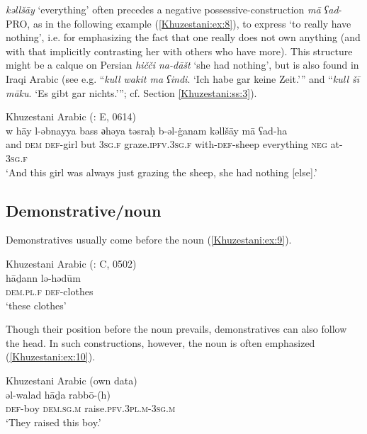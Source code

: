 \documentclass[output=paper,colorlinks,citecolor=brown,draftmode]{langscibook}
\begin{document}
\textit{kəllšāy} `everything' often precedes a negative possessive-construction \textit{mā ʕad}-PRO, as in the following example (\ref{Khuzestani:ex:8}), to express `to really have nothing', i.e. for emphasizing the fact that one really does not own anything (and with that implicitly contrasting her with others who have more). This structure might be a calque on Persian \textit{hičči na-dāšt} `she had nothing', but is also found in Iraqi Arabic (see e.g. \citealt[172]{leitner2021lehrbuch} ``\textit{kull wakit ma ʕindi}. `Ich habe gar keine Zeit.'{}'' and ``\textit{kull šī māku}. `Es gibt gar nichts.'{}''; cf. Section \ref{Khuzestani:ss:3}). 

\ea\label{Khuzestani:ex:8}
Khuzestani Arabic (\citealt{leitnerArabic2021}: E, 0614) \\
\gll w hāy l-əbnayya bass әhəya təsraḥ b-əl-ġanam kəllšāy mā ʕad-ha \\
and \textsc{dem} \textsc{def-}girl but \textsc{3sg.f} graze\textsc{.ipfv.3sg.f} with\textsc{-def-}sheep everything \textsc{neg} at\textsc{-3sg.f} \\
\glt `And this girl was always just grazing the sheep, she had nothing [else].' 
\z

\subsection{Demonstrative/noun }\label{Khuzestani:ss:2.3}

Demonstratives usually come before the noun (\ref{Khuzestani:ex:9}). 

\ea\label{Khuzestani:ex:9}
Khuzestani Arabic (\citealt{leitnerArabic2021}: C, 0502) \\
\gll hāḏann lə-hədūm \\
\textsc{dem.pl.f} \textsc{def-}clothes \\
\glt `these clothes' 
\z

Though their position before the noun prevails, demonstratives can also follow the head. In such constructions, however, the noun is often emphasized (\ref{Khuzestani:ex:10}).

\ea\label{Khuzestani:ex:10}
Khuzestani Arabic (own data) \\
\gll əl-walad hāḏa rabbō-(h) \\
\textsc{def-}boy \textsc{dem.sg.m} raise\textsc{.pfv.3pl.m-3sg.m} \\
\glt `They raised this boy.' 
\z
\end{document}
